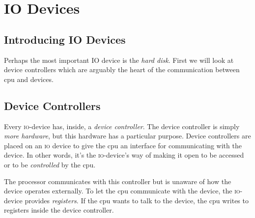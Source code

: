 

\chapter{IO Devices}


\section{Introducing IO Devices}


Perhaps the most important IO device is the \textit{hard disk}. 
First we will look at device controllers which are arguably the heart of the
communication between cpu and devices. 

\section{Device Controllers}

Every \textsc{io}-device has, inside, a \textit{device controller}.  
The device controller is simply \textit{more hardware}, 
but this hardware has a particular purpose. 
Device controllers are placed on an \textsc{io} device to give the cpu an interface for communicating
with the device. In other words, it's the \textsc{io}-device's way of making it open to be 
accessed or to be \textit{controlled} by the cpu.

\begin{figure}[h]
\end{figure} 

The processor communicates with this controller but is unaware of how the device 
operates externally. To let the cpu communicate with the device, the \textsc{io}-device provides 
\textit{registers}. If the cpu wants to talk to the device, the cpu writes 
to registers inside the device controller. 


